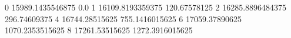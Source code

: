 0 15989.1435546875 0.0
1 16109.8193359375 120.67578125
2 16285.8896484375 296.74609375
4 16744.28515625 755.1416015625
6 17059.37890625 1070.2353515625
8 17261.53515625 1272.3916015625
